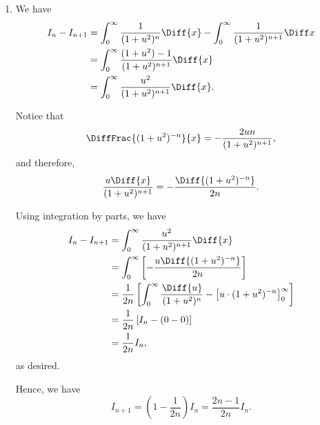 \Question{\currfilebase}

\begin{enumerate}
    \item We have
          \begin{align*}
              I_n - I_{n + 1} & = \int_0^{\infty} \frac{1}{(1 + u^2)^n} \Diff{x} - \int_0^{\infty} \frac{1}{(1 + u^2)^{n + 1}} \Diff x \\
                              & = \int_0^{\infty} \frac{(1 + u^2) - 1}{(1 + u^2)^{n + 1}} \Diff{x}                                     \\
                              & = \int_0^{\infty} \frac{u^2}{(1 + u^2)^{n + 1}} \Diff{x}.
          \end{align*}

          Notice that
          \[
              \DiffFrac{(1 + u^2)^{-n}}{x} = - \frac{2un}{(1 + u^2)^{n + 1}},
          \]
          and therefore,
          \[
              \frac{u\Diff{x}}{(1 + u^2)^{n + 1}} = - \frac{\Diff{(1 + u^2)^{-n}}}{2n}.
          \]

          Using integration by parts, we have
          \begin{align*}
              I_n - I_{n + 1} & = \int_0^{\infty} \frac{u^2}{(1 + u^2)^{n + 1}} \Diff{x}                                                                 \\
                              & = \int_0^{\infty} \left[ - \frac{u\Diff{(1 + u^2)^{-n}}}{2n}\right]                                                      \\
                              & = \frac{1}{2n}\left[\int_0^{\infty} \frac{\Diff{u}}{(1 + u^2)^n} - \left[u \cdot (1 + u^2)^{-n}\right]^{\infty}_0\right] \\
                              & = \frac{1}{2n} \left[I_n - (0 - 0)\right]                                                                                \\
                              & = \frac{1}{2n} I_n,
          \end{align*}
          as desired.

          Hence, we have
          \[
              I_{n + 1} = \left(1 - \frac{1}{2n}\right) I_n = \frac{2n - 1}{2n} I_n.
          \]


\end{enumerate}
